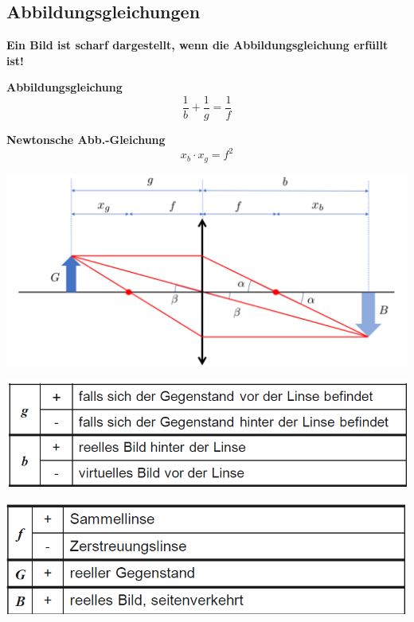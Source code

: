 

\subsection{Abbildungsgleichungen}
\textbf{Ein Bild ist scharf dargestellt, wenn die Abbildungsgleichung erfüllt ist!} \\



\begin{minipage}{0.48\linewidth}
	\begin{center}
		\textbf{Abbildungsgleichung} \\
		$$ \boxed{ \frac{1}{b} + \frac{1}{g} = \frac{1}{f} } $$
	\end{center}
\end{minipage}
\hfill
\begin{minipage}{0.48\linewidth}
	\begin{center}
		\textbf{Newtonsche Abb.-Gleichung} \\
		$$ \boxed{ x_b \cdot x_g = f^2 } $$
	\end{center}
\end{minipage}


\includegraphics[width=\linewidth]{Bilder/Wellen-Optik/abbildungsgleichung}
\begin{minipage}{0.50\linewidth}
	\includegraphics[width=\linewidth]{Bilder/Wellen-Optik/abbildungsgleichung-1.png}
\end{minipage}
\hfill
\begin{minipage}{0.48\linewidth}
	\includegraphics[width=\linewidth]{Bilder/Wellen-Optik/abbildungsgleichung-2.png}
\end{minipage}

